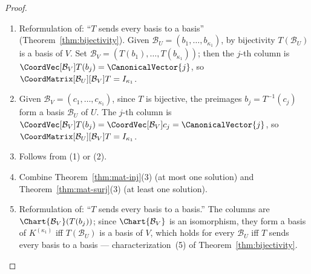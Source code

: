 \begin{proof}
    \leavevmode
    \begin{enumerate}
        \item Reformulation of: ``$T$ sends every basis to a basis''
              (Theorem~\ref{thm:bijectivity}). Given
              $\mathcal{B}_U = (b_1, \ldots, b_{\kappa_1})$, by bijectivity
              $T(\mathcal{B}_U)$ is a basis of $V$. Set
              $\mathcal{B}_V = (T(b_1), \ldots, T(b_{\kappa_1}))$; then the $j$-th column
              is $\CoordVec[\mathcal{B}_V]{T(b_j)} = \CanonicalVector{j}$, so
              $\CoordMatrix[\mathcal{B}_U][\mathcal{B}_V]{T} = I_{\kappa_1}$.

        \item Given $\mathcal{B}_V = (c_1, \ldots, c_{\kappa_1})$, since $T$ is bijective,
              the preimages $b_j = T^{-1}(c_j)$ form a basis $\mathcal{B}_U$ of $U$. The
              $j$-th column is $\CoordVec[\mathcal{B}_V]{T(b_j)} = \CoordVec[\mathcal{B}_V]{c_j}
              = \CanonicalVector{j}$, so $\CoordMatrix[\mathcal{B}_U][\mathcal{B}_V]{T} = I_{\kappa_1}$.

        \item Follows from (1) or (2).

        \item Combine Theorem~\ref{thm:mat-inj}(3) (at most one solution) and
              Theorem~\ref{thm:mat-surj}(3) (at least one solution).

        \item Reformulation of: ``$T$ sends every basis to a basis.''
              The columns are $\Chart{\mathcal{B}_V}(T(b_j))$; since $\Chart{\mathcal{B}_V}$
              is an isomorphism, they form a basis of $K^{(\kappa_1)}$ iff $T(\mathcal{B}_U)$
              is a basis of $V$, which holds for every $\mathcal{B}_U$ iff $T$ sends every
              basis to a basis --- characterization~(5) of
              Theorem~\ref{thm:bijectivity}. \qedhere
    \end{enumerate}
\end{proof}

